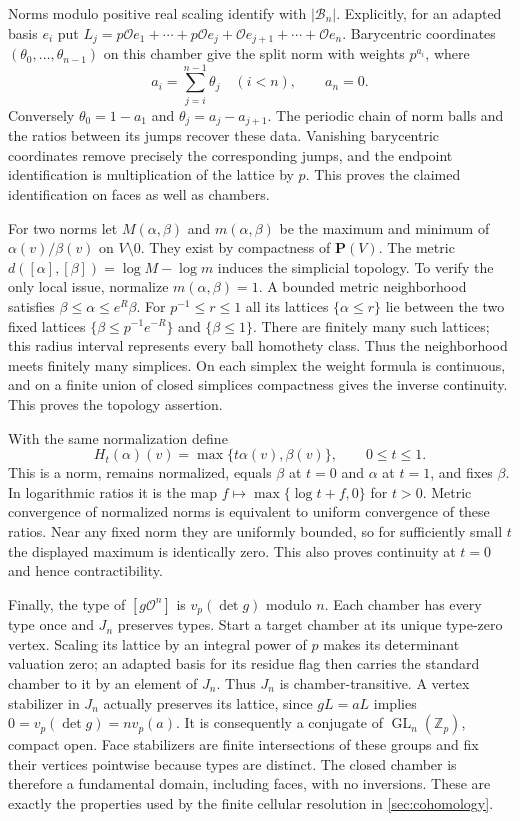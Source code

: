 \documentclass[11pt]{article}
\numberwithin{equation}{section}
\theoremstyle{definition}
\theoremstyle{remark}
\begin{document}
Norms modulo positive real scaling identify with $|\mathcal B_n|$.
Explicitly, for an adapted basis $e_i$ put
$L_j=p\mathcal O e_1+\cdots+p\mathcal O e_j+\mathcal O e_{j+1}+\cdots+\mathcal O e_n$.
Barycentric coordinates $(\theta_0,\ldots,\theta_{n-1})$ on this chamber
give the split norm with weights $p^{a_i}$, where
\[
 a_i=\sum_{j=i}^{n-1}\theta_j\quad(i<n),\qquad a_n=0.
\]
Conversely $\theta_0=1-a_1$ and $\theta_j=a_j-a_{j+1}$.
The periodic chain of norm balls and the ratios between its jumps recover
these data.  Vanishing barycentric coordinates remove precisely the
corresponding jumps, and the endpoint identification is multiplication
of the lattice by $p$.  This proves the claimed identification on faces
as well as chambers.

For two norms let $M(\alpha,\beta)$ and $m(\alpha,\beta)$ be the
maximum and minimum of $\alpha(v)/\beta(v)$ on $V\setminus0$.
They exist by compactness of $\mathbf P(V)$.  The metric
$d([\alpha],[\beta])=\log M-\log m$ induces the simplicial topology.
To verify the only local issue, normalize $m(\alpha,\beta)=1$.
A bounded metric neighborhood satisfies
$\beta\le\alpha\le e^R\beta$.  For $p^{-1}\le r\le1$ all its
lattices $\{\alpha\le r\}$ lie between the two fixed lattices
$\{\beta\le p^{-1}e^{-R}\}$ and $\{\beta\le1\}$.
There are finitely many such lattices; this radius interval represents
every ball homothety class.  Thus the neighborhood meets finitely many
simplices.  On each simplex the weight formula is continuous, and on
a finite union of closed simplices compactness gives the inverse
continuity.  This proves the topology assertion.

With the same normalization define
\[
 H_t(\alpha)(v)=\max\{t\alpha(v),\beta(v)\},\qquad 0\le t\le1.
\]
This is a norm, remains normalized, equals $\beta$ at $t=0$ and
$\alpha$ at $t=1$, and fixes $\beta$.  In logarithmic ratios it is the
map $f\mapsto\max\{\log t+f,0\}$ for $t>0$.
Metric convergence of normalized norms is equivalent to uniform
convergence of these ratios.  Near any fixed norm they are uniformly
bounded, so for sufficiently small $t$ the displayed maximum is
identically zero.  This also proves continuity at $t=0$ and hence
contractibility.

Finally, the type of $[g\mathcal O^n]$ is $v_p(\det g)$ modulo $n$.
Each chamber has every type once and $J_n$ preserves types.
Start a target chamber at its unique type-zero vertex.  Scaling its
lattice by an integral power of $p$ makes its determinant valuation zero;
an adapted basis for its residue flag then carries the standard chamber
to it by an element of $J_n$.  Thus $J_n$ is chamber-transitive.
A vertex stabilizer in $J_n$ actually preserves its lattice, since
$gL=aL$ implies $0=v_p(\det g)=n v_p(a)$.  It is consequently a
conjugate of $\operatorname{GL}_n(\mathbb Z_p)$, compact open.  Face stabilizers are finite
intersections of these groups and fix their vertices pointwise because
types are distinct.  The closed chamber is therefore a fundamental
domain, including faces, with no inversions.  These are exactly the
properties used by the finite cellular resolution in \cref{sec:cohomology}.
\end{document}
